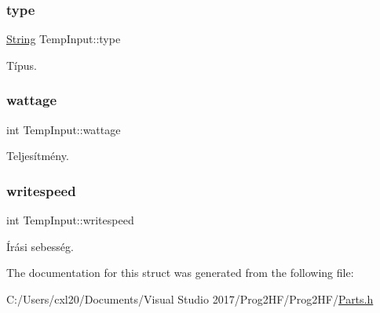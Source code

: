 \subsubsection{\texorpdfstring{type}{type}}
{\footnotesize\ttfamily \mbox{\hyperlink{class_string}{String}} Temp\+Input\+::type}



Típus. 

\mbox{\label{struct_temp_input_a2764957397bba59e827c66aeb1821279}} 
\subsubsection{\texorpdfstring{wattage}{wattage}}
{\footnotesize\ttfamily int Temp\+Input\+::wattage}



Teljesítmény. 

\mbox{\label{struct_temp_input_a3d5511c959e7c3531ce3bea3a6248d62}} 
\subsubsection{\texorpdfstring{writespeed}{writespeed}}
{\footnotesize\ttfamily int Temp\+Input\+::writespeed}



Írási sebesség. 



The documentation for this struct was generated from the following file\+:\begin{DoxyCompactItemize}
\item 
C\+:/\+Users/cxl20/\+Documents/\+Visual Studio 2017/\+Prog2\+H\+F/\+Prog2\+H\+F/\mbox{\hyperlink{_parts_8h}{Parts.\+h}}\end{DoxyCompactItemize}
